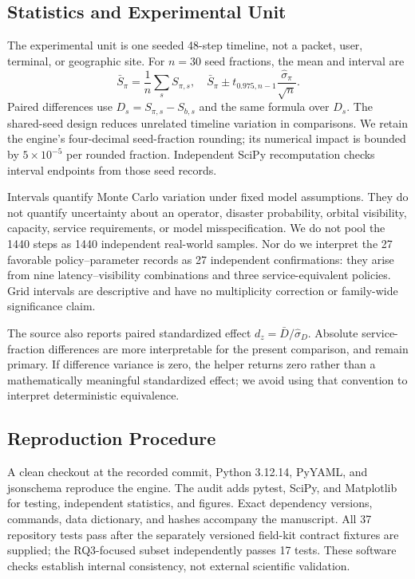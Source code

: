 \documentclass{IEEEoj}
\begin{document}
\subsection{Statistics and Experimental Unit}
The experimental unit is one seeded 48-step timeline, not a packet, user, terminal, or geographic site. For $n=30$ seed fractions, the mean and interval are
\begin{equation}
 \bar S_\pi=\frac1n\sum_s S_{\pi,s},\quad
 \bar S_\pi\pm t_{0.975,n-1}\frac{\hat\sigma_\pi}{\sqrt n}.
\end{equation}
Paired differences use $D_s=S_{\pi,s}-S_{b,s}$ and the same formula over $D_s$. The shared-seed design reduces unrelated timeline variation in comparisons. We retain the engine's four-decimal seed-fraction rounding; its numerical impact is bounded by $5\times10^{-5}$ per rounded fraction. Independent SciPy recomputation checks interval endpoints from those seed records.

Intervals quantify Monte Carlo variation under fixed model assumptions. They do not quantify uncertainty about an operator, disaster probability, orbital visibility, capacity, service requirements, or model misspecification. We do not pool the 1440 steps as 1440 independent real-world samples. Nor do we interpret the 27 favorable policy--parameter records as 27 independent confirmations: they arise from nine latency--visibility combinations and three service-equivalent policies. Grid intervals are descriptive and have no multiplicity correction or family-wide significance claim.

The source also reports paired standardized effect $d_z=\bar D/\hat\sigma_D$. Absolute service-fraction differences are more interpretable for the present comparison, and remain primary. If difference variance is zero, the helper returns zero rather than a mathematically meaningful standardized effect; we avoid using that convention to interpret deterministic equivalence.

\subsection{Reproduction Procedure}
A clean checkout at the recorded commit, Python 3.12.14, PyYAML, and jsonschema reproduce the engine. The audit adds pytest, SciPy, and Matplotlib for testing, independent statistics, and figures. Exact dependency versions, commands, data dictionary, and hashes accompany the manuscript. All 37 repository tests pass after the separately versioned field-kit contract fixtures are supplied; the RQ3-focused subset independently passes 17 tests. These software checks establish internal consistency, not external scientific validation.
\end{document}
